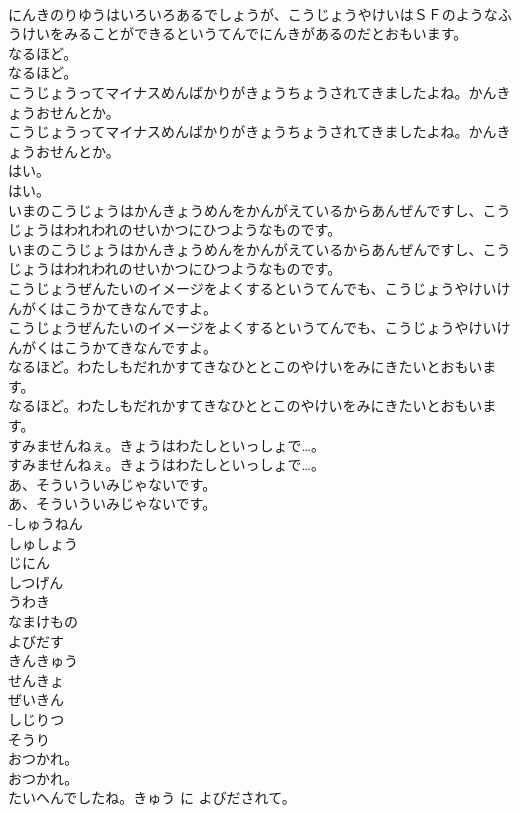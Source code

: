 \documentclass[8pt]{extreport}
\begin{document}
\begin{CJK}{UTF8}{min}
\\	にんきのりゆうはいろいろあるでしょうが、こうじょうやけいはＳＦのようなふうけいをみることができるというてんでにんきがあるのだとおもいます。
\\	なるほど。
\\	なるほど。
\\	こうじょうってマイナスめんばかりがきょうちょうされてきましたよね。かんきょうおせんとか。
\\	こうじょうってマイナスめんばかりがきょうちょうされてきましたよね。かんきょうおせんとか。
\\	はい。
\\	はい。
\\	いまのこうじょうはかんきょうめんをかんがえているからあんぜんですし、こうじょうはわれわれのせいかつにひつようなものです。
\\	いまのこうじょうはかんきょうめんをかんがえているからあんぜんですし、こうじょうはわれわれのせいかつにひつようなものです。
\\	こうじょうぜんたいのイメージをよくするというてんでも、こうじょうやけいけんがくはこうかてきなんですよ。
\\	こうじょうぜんたいのイメージをよくするというてんでも、こうじょうやけいけんがくはこうかてきなんですよ。
\\	なるほど。わたしもだれかすてきなひととこのやけいをみにきたいとおもいます。
\\	なるほど。わたしもだれかすてきなひととこのやけいをみにきたいとおもいます。
\\	すみませんねぇ。きょうはわたしといっしょで…。
\\	すみませんねぇ。きょうはわたしといっしょで…。
\\	あ、そういういみじゃないです。
\\	あ、そういういみじゃないです。
\\	-しゅうねん
\\	しゅしょう
\\	じにん
\\	しつげん
\\	うわき
\\	なまけもの
\\	よびだす
\\	きんきゅう
\\	せんきょ
\\	ぜいきん
\\	しじりつ
\\	そうり
\\	おつかれ。
\\	おつかれ。
\\	たいへんでしたね。きゅう に よびだされて。

\end{CJK}
\end{document}
